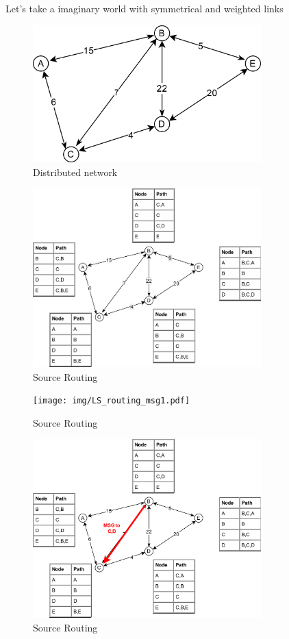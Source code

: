 \documentclass{article}
\begin{document}
Let's take a imaginary world with symmetrical and weighted links
\begin{figure}
  \includegraphics[width=250pt]{img/distributed_graph.pdf}
  \caption{Distributed network}
  \label{fig:dg}
\end{figure}

\begin{figure}
  \includegraphics[width=250pt]{img/LS_routing.pdf}
  \caption{Source Routing}
  \label{fig:LS}
\end{figure}

\begin{figure}
  \texttt{[image: img/LS\_routing\_msg1.pdf]}
  \caption{Source Routing}
  \label{fig:LSmsg_1}
\end{figure}

\begin{figure}
  \includegraphics[width=250pt]{img/LS_routing_msg2.pdf}
  \caption{Source Routing}
  \label{fig:LSmsg_2}
\end{figure}
\end{document}
